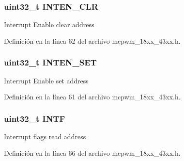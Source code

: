 \subsubsection[{\texorpdfstring{I\+N\+T\+E\+N\+\_\+\+C\+LR}{INTEN_CLR}}]{ uint32\+\_\+t I\+N\+T\+E\+N\+\_\+\+C\+LR}\hypertarget{struct_l_p_c___m_c_p_w_m___t_af708d451028ba3c25e0f8252f6a3724f}{}\label{struct_l_p_c___m_c_p_w_m___t_af708d451028ba3c25e0f8252f6a3724f}
Interrupt Enable clear address 

Definición en la línea 62 del archivo mcpwm\+\_\+18xx\+\_\+43xx.\+h.

\subsubsection[{\texorpdfstring{I\+N\+T\+E\+N\+\_\+\+S\+ET}{INTEN_SET}}]{ uint32\+\_\+t I\+N\+T\+E\+N\+\_\+\+S\+ET}\hypertarget{struct_l_p_c___m_c_p_w_m___t_a14848d89e6799c2def720358c0b240b8}{}\label{struct_l_p_c___m_c_p_w_m___t_a14848d89e6799c2def720358c0b240b8}
Interrupt Enable set address 

Definición en la línea 61 del archivo mcpwm\+\_\+18xx\+\_\+43xx.\+h.

\subsubsection[{\texorpdfstring{I\+N\+TF}{INTF}}]{ uint32\+\_\+t I\+N\+TF}\hypertarget{struct_l_p_c___m_c_p_w_m___t_a18f737678d307d81d978bb15d13600f8}{}\label{struct_l_p_c___m_c_p_w_m___t_a18f737678d307d81d978bb15d13600f8}
Interrupt flags read address 

Definición en la línea 66 del archivo mcpwm\+\_\+18xx\+\_\+43xx.\+h.

